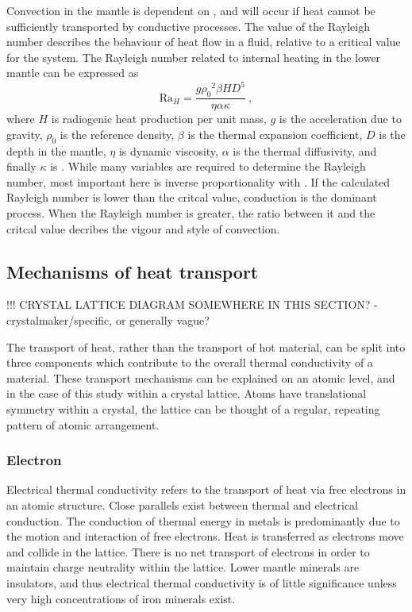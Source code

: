 Convection in the mantle is dependent on \tc, and will occur if heat cannot be sufficiently transported by conductive processes. The value of the Rayleigh number describes the behaviour of heat flow in a fluid, relative to a critical value for the system. The Rayleigh number related to internal heating in the lower mantle can be expressed as
%
\begin{equation}
\mathrm{Ra}_{H} = \frac{g {\rho_{0}}^{2} \beta H D^5}{\eta \alpha \kappa}\ ,
\label{eq:rayleigh}
\end{equation}
%
where $H$ is radiogenic heat production per unit mass, $g$ is the acceleration due to gravity, $\rho_{0}$ is the reference density, $\beta$ is the thermal expansion coefficient, $D$ is the depth in the mantle, $\eta$ is dynamic viscosity, $\alpha$ is the thermal diffusivity, and finally $\kappa$ is \tc.
While many variables are required to determine the Rayleigh number, most important here is inverse proportionality with \tc. If the calculated Rayleigh number is lower than the critcal value, conduction is the dominant process. When the Rayleigh number is greater, the ratio between it and the critcal value decribes the vigour and style of convection.

\subsection{Mechanisms of heat transport}

!!! CRYSTAL LATTICE DIAGRAM SOMEWHERE IN THIS SECTION? - crystalmaker/specific, or generally vague?

The transport of heat, rather than the transport of hot material, can be split into three components which contribute to the overall thermal conductivity of a material. These transport mechanisms can be explained on an atomic level, and in the case of this study within a crystal lattice. Atoms have translational symmetry within a crystal, the lattice can be thought of a regular, repeating pattern of atomic arrangement. 



\subsubsection{Electron}

Electrical thermal conductivity refers to the transport of heat via free electrons in an atomic structure. Close parallels exist between thermal and electrical conduction. The conduction of thermal energy in metals is predominantly due to the motion and interaction of free electrons. Heat is transferred as electrons move and collide in the lattice. There is no net transport of electrons in order to maintain charge neutrality within the lattice. Lower mantle minerals are insulators, and thus electrical thermal conductivity is of little significance unless very high concentrations of iron minerals exist. 

